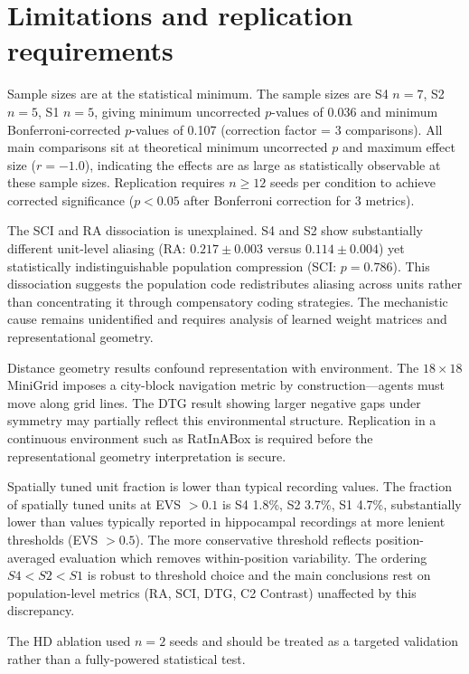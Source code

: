 \documentclass[11pt, a4paper]{article}
\begin{document}
\section*{Limitations and replication requirements}

Sample sizes are at the statistical minimum. The sample sizes are S4 $n=7$, S2 $n=5$, S1 $n=5$, giving minimum uncorrected $p$-values of 0.036 and minimum Bonferroni-corrected $p$-values of 0.107 (correction factor = 3 comparisons). All main comparisons sit at theoretical minimum uncorrected $p$ and maximum effect size ($r = -1.0$), indicating the effects are as large as statistically observable at these sample sizes. Replication requires $n \geq 12$ seeds per condition to achieve corrected significance ($p < 0.05$ after Bonferroni correction for 3 metrics).

The SCI and RA dissociation is unexplained. S4 and S2 show substantially different unit-level aliasing (RA: $0.217 \pm 0.003$ versus $0.114 \pm 0.004$) yet statistically indistinguishable population compression (SCI: $p = 0.786$). This dissociation suggests the population code redistributes aliasing across units rather than concentrating it through compensatory coding strategies. The mechanistic cause remains unidentified and requires analysis of learned weight matrices and representational geometry.

Distance geometry results confound representation with environment. The $18 \times 18$ MiniGrid imposes a city-block navigation metric by construction---agents must move along grid lines. The DTG result showing larger negative gaps under symmetry may partially reflect this environmental structure. Replication in a continuous environment such as RatInABox is required before the representational geometry interpretation is secure.

Spatially tuned unit fraction is lower than typical recording values. The fraction of spatially tuned units at EVS $> 0.1$ is S4 1.8\%, S2 3.7\%, S1 4.7\%, substantially lower than values typically reported in hippocampal recordings at more lenient thresholds (EVS $> 0.5$). The more conservative threshold reflects position-averaged evaluation which removes within-position variability. The ordering $S4 < S2 < S1$ is robust to threshold choice and the main conclusions rest on population-level metrics (RA, SCI, DTG, C2 Contrast) unaffected by this discrepancy.

The HD ablation used $n=2$ seeds and should be treated as a targeted validation rather than a fully-powered statistical test.
\end{document}
